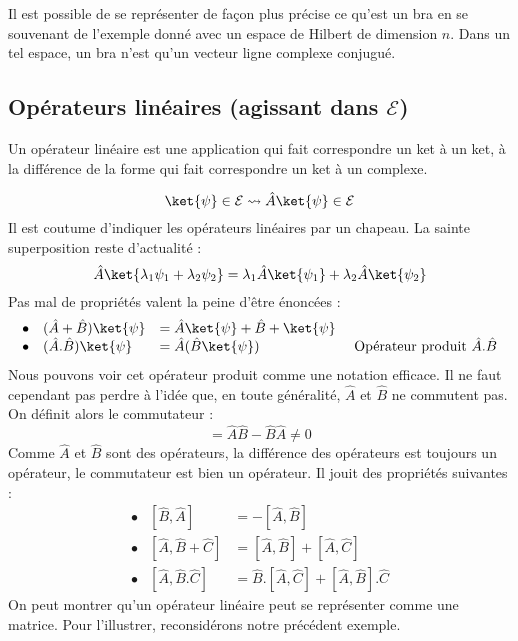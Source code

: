Il est possible de se représenter de façon plus précise ce qu'est un bra en 
se souvenant de l'exemple donné avec un espace de Hilbert de dimension $n$. Dans 
un tel espace, un bra n'est qu'un vecteur ligne complexe conjugué.

\subsection{Opérateurs linéaires (agissant dans $\mathcal{E}$)}
Un opérateur linéaire est une application qui fait correspondre un ket à un ket, à 
la différence de la forme qui fait correspondre un ket à un complexe.

\begin{equation}
\ket{\psi} \in \mathcal{E} \leadsto \hat{A}\ket{\psi} \in \mathcal{E}
\end{equation}
Il est coutume d'indiquer les opérateurs linéaires par un chapeau. La sainte 
superposition reste d'actualité :
\begin{equation}
\hat{A}\ket{\lambda_1\psi_1+\lambda_2\psi_2} = \lambda_1\hat{A}\ket{\psi_1}+
\lambda_2\hat{A}\ket{\psi_2}
\end{equation}
Pas mal de propriétés valent la peine d'être énoncées :
\begin{equation}
\begin{array}{llll}
\bullet & (\hat{A}+\hat{B})\ket{\psi} &= \hat{A}\ket{\psi}+\hat{B}+\ket{\psi}\\
\bullet & (\hat{A}.\hat{B})\ket{\psi} &= \hat{A}(\hat{B}\ket{\psi})\qquad & \text{ Opérateur 
produit $\hat{A}.\hat{B}$}
\end{array}
\end{equation}
Nous pouvons voir cet opérateur produit comme une notation efficace. Il ne faut 
cependant pas perdre à l'idée que, en toute généralité, $\hat{A}$ et $\hat{B}$ 
ne commutent pas. On définit alors le commutateur :
\begin{equation}
[\hat{A},\hat{B}] = \hat{A}\hat{B} - \hat{B}\hat{A} \neq 0
\end{equation}
Comme $\hat{A}$ et $\hat{B}$ sont des opérateurs, la différence des opérateurs 
est toujours un opérateur, le commutateur est bien un opérateur. Il jouit des 
propriétés suivantes :
\begin{equation}
\begin{array}{lll}
\bullet & [\hat{B},\hat{A}] &= -[\hat{A},\hat{B}]\\
\bullet & [\hat{A},\hat{B}+\hat{C}] &= [\hat{A},\hat{B}]+[\hat{A},\hat{C}]\\
\bullet & [\hat{A},\hat{B}.\hat{C}] &= \hat{B}.[\hat{A},\hat{C}]+[\hat{A},
\hat{B}].\hat{C}
\end{array}
\end{equation}
On peut montrer qu'un opérateur linéaire peut se représenter comme une 
matrice. Pour l'illustrer, reconsidérons notre précédent exemple.\\

